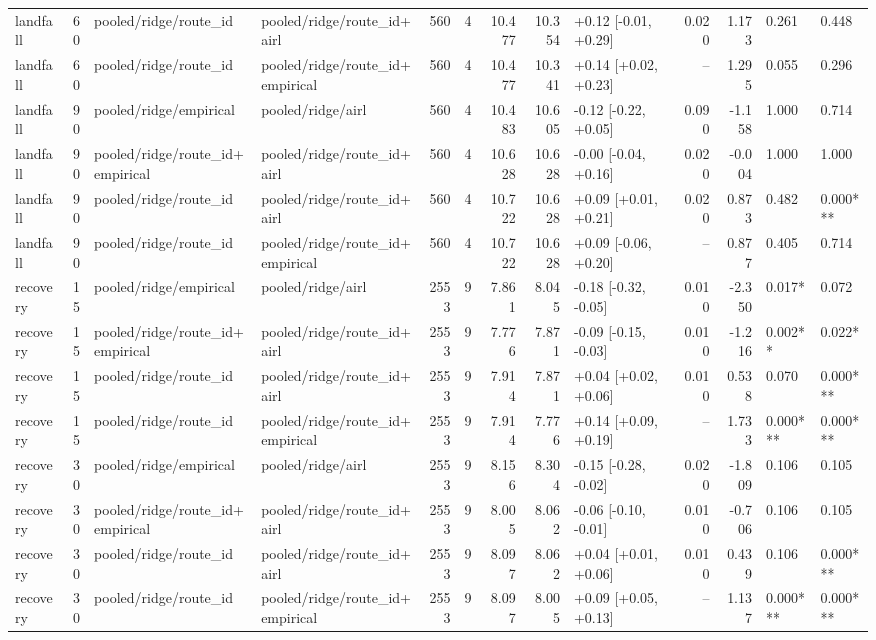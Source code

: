 \begin{tabular}{lrllrrrrlrrll}
landfall & 60 & pooled/ridge/route_id & pooled/ridge/route_id+airl & 560 & 4 & 10.477 & 10.354 & +0.12 [-0.01, +0.29] & 0.020 & 1.173 & 0.261 & 0.448 \\
landfall & 60 & pooled/ridge/route_id & pooled/ridge/route_id+empirical & 560 & 4 & 10.477 & 10.341 & +0.14 [+0.02, +0.23] & -- & 1.295 & 0.055 & 0.296 \\
landfall & 90 & pooled/ridge/empirical & pooled/ridge/airl & 560 & 4 & 10.483 & 10.605 & -0.12 [-0.22, +0.05] & 0.090 & -1.158 & 1.000 & 0.714 \\
landfall & 90 & pooled/ridge/route_id+empirical & pooled/ridge/route_id+airl & 560 & 4 & 10.628 & 10.628 & -0.00 [-0.04, +0.16] & 0.020 & -0.004 & 1.000 & 1.000 \\
landfall & 90 & pooled/ridge/route_id & pooled/ridge/route_id+airl & 560 & 4 & 10.722 & 10.628 & +0.09 [+0.01, +0.21] & 0.020 & 0.873 & 0.482 & 0.000*** \\
landfall & 90 & pooled/ridge/route_id & pooled/ridge/route_id+empirical & 560 & 4 & 10.722 & 10.628 & +0.09 [-0.06, +0.20] & -- & 0.877 & 0.405 & 0.714 \\
recovery & 15 & pooled/ridge/empirical & pooled/ridge/airl & 2553 & 9 & 7.861 & 8.045 & -0.18 [-0.32, -0.05] & 0.010 & -2.350 & 0.017* & 0.072 \\
recovery & 15 & pooled/ridge/route_id+empirical & pooled/ridge/route_id+airl & 2553 & 9 & 7.776 & 7.871 & -0.09 [-0.15, -0.03] & 0.010 & -1.216 & 0.002** & 0.022* \\
recovery & 15 & pooled/ridge/route_id & pooled/ridge/route_id+airl & 2553 & 9 & 7.914 & 7.871 & +0.04 [+0.02, +0.06] & 0.010 & 0.538 & 0.070 & 0.000*** \\
recovery & 15 & pooled/ridge/route_id & pooled/ridge/route_id+empirical & 2553 & 9 & 7.914 & 7.776 & +0.14 [+0.09, +0.19] & -- & 1.733 & 0.000*** & 0.000*** \\
recovery & 30 & pooled/ridge/empirical & pooled/ridge/airl & 2553 & 9 & 8.156 & 8.304 & -0.15 [-0.28, -0.02] & 0.020 & -1.809 & 0.106 & 0.105 \\
recovery & 30 & pooled/ridge/route_id+empirical & pooled/ridge/route_id+airl & 2553 & 9 & 8.005 & 8.062 & -0.06 [-0.10, -0.01] & 0.010 & -0.706 & 0.106 & 0.105 \\
recovery & 30 & pooled/ridge/route_id & pooled/ridge/route_id+airl & 2553 & 9 & 8.097 & 8.062 & +0.04 [+0.01, +0.06] & 0.010 & 0.439 & 0.106 & 0.000*** \\
recovery & 30 & pooled/ridge/route_id & pooled/ridge/route_id+empirical & 2553 & 9 & 8.097 & 8.005 & +0.09 [+0.05, +0.13] & -- & 1.137 & 0.000*** & 0.000*** \\

\end{tabular}
